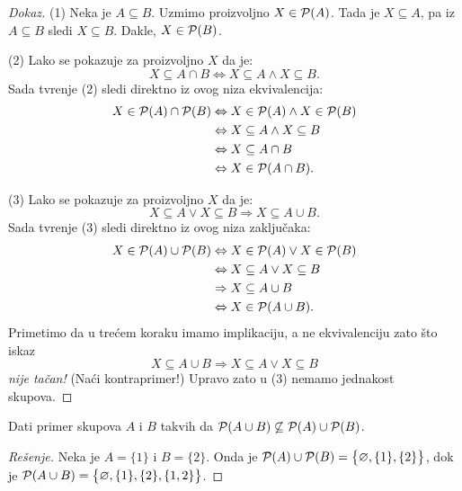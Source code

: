 \begin{proof}[Dokaz]
  (1)
  Neka je $A \subseteq B$. Uzmimo proizvoljno $X \in \mathcal{P}(A)$. Tada je $X \subseteq A$, pa iz
  $A \subseteq B$ sledi $X \subseteq B$. Dakle, $X \in \mathcal{P}(B)$.
  
  \medskip
  
  (2)
  Lako se pokazuje za proizvoljno $X$ da je:
  $$
    X \subseteq A \cap B \Leftrightarrow X \subseteq A \land X \subseteq B.
  $$
  Sada tvr\dj enje (2) sledi direktno iz ovog niza ekvivalencija:
  \begin{align*}
    X \in \mathcal{P}(A) \cap \mathcal{P}(B)
    &\Leftrightarrow X \in \mathcal{P}(A) \land X \in \mathcal{P}(B)\\
    &\Leftrightarrow X \subseteq A \land X \subseteq B\\
    &\Leftrightarrow X \subseteq A \cap B\\
    &\Leftrightarrow X \in \mathcal{P}(A \cap B).
  \end{align*}

  \medskip
  
  (3)
  Lako se pokazuje za proizvoljno $X$ da je:
  $$
    X \subseteq A \lor X \subseteq B \Rightarrow X \subseteq A \cup B.
  $$
  Sada tvr\dj enje (3) sledi direktno iz ovog niza zaklju\v caka:
  \begin{align*}
    X \in \mathcal{P}(A) \cup \mathcal{P}(B)
    &\Leftrightarrow X \in \mathcal{P}(A) \lor X \in \mathcal{P}(B)\\
    &\Leftrightarrow X \subseteq A \lor X \subseteq B\\
    &\Rightarrow X \subseteq A \cup B\\
    &\Leftrightarrow X \in \mathcal{P}(A \cup B).\qedhere
  \end{align*}
  Primetimo da u tre\'cem koraku imamo implikaciju, a ne ekvivalenciju zato \v sto iskaz
  $$
    X \subseteq A \cup B \Rightarrow X \subseteq A \lor X \subseteq B
  $$
  \emph{nije ta\v can!} (Na\'ci kontraprimer!)
  Upravo zato u (3) nemamo jednakost skupova.
\end{proof}

\begin{EX}
  Dati primer skupova $A$ i $B$ takvih da $\mathcal{P}(A \cup B) \not\subseteq \mathcal{P}(A) \cup \mathcal{P}(B)$.
\end{EX}
\begin{proof}[Re\v senje]
  Neka je $A = \{1\}$ i $B = \{2\}$. Onda je
  $
    \mathcal{P}(A) \cup \mathcal{P}(B) = \big\{\varnothing, \{1\}, \{2\}\big\}
  $,
  dok je
  $
    \mathcal{P}(A \cup B) = \big\{\varnothing, \{1\}, \{2\}, \{1, 2\}\big\}
  $.
\end{proof}

